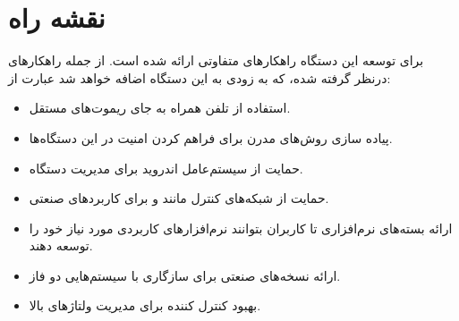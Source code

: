 % 
% 
% 

% 
%

\section{نقشه راه}

برای توسعه این دستگاه راهکارهای متفاوتی ارائه شده است. از جمله راهکارهای درنظر
گرفته شده، که به زودی به این دستگاه اضافه خواهد شد عبارت از:

\begin{itemize}
  \item استفاده از تلفن همراه به جای ریموت‌های مستقل.
  \item پیاده سازی روش‌های مدرن برای فراهم کردن امنیت در این دستگاه‌ها.
  \item حمایت از سیستم‌عامل اندروید برای مدیریت دستگاه.
  \item حمایت از شبکه‌های کنترل مانند  و  برای کاربردهای
  صنعتی.
  \item ارائه بسته‌های نرم‌افزاری تا کاربران بتوانند نرم‌افزارهای کاربردی مورد
  نیاز خود را توسعه دهند.
  \item ارائه نسخه‌های صنعتی برای سازگاری با سیستم‌هایی دو فاز.
  \item بهبود کنترل کننده برای مدیریت ولتاژهای بالا.
\end{itemize}

